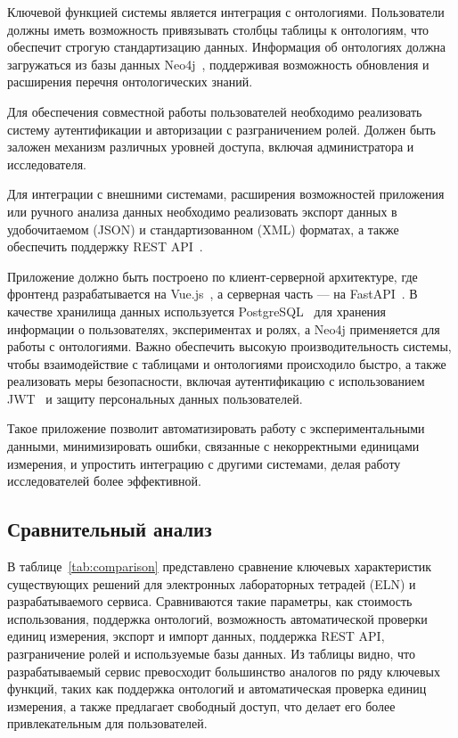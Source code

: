 Ключевой функцией системы является интеграция с онтологиями.
Пользователи должны иметь возможность привязывать столбцы таблицы к онтологиям, что обеспечит строгую стандартизацию данных.
Информация об онтологиях должна загружаться из базы данных Neo4j~\cite{DB:Neo4j}, поддерживая возможность обновления и расширения перечня онтологических знаний.

Для обеспечения совместной работы пользователей необходимо реализовать систему аутентификации и авторизации с разграничением ролей.
Должен быть заложен механизм различных уровней доступа, включая администратора и исследователя.

Для интеграции с внешними системами, расширения возможностей приложения или ручного анализа данных необходимо реализовать экспорт данных в удобочитаемом (JSON) и стандартизованном (XML) форматах, а также обеспечить поддержку REST API~\cite{arch:REST}.

Приложение должно быть построено по клиент-серверной архитектуре, где фронтенд разрабатывается на Vue.js~\cite{Framework:VueJS}, а серверная часть — на FastAPI~\cite{Framework:FastAPI}.
В качестве хранилища данных используется PostgreSQL~\cite{DB:PostgreSQL} для хранения информации о пользователях, экспериментах и ролях, а Neo4j применяется для работы с онтологиями.
Важно обеспечить высокую производительность системы, чтобы взаимодействие с таблицами и онтологиями происходило быстро, а также реализовать меры безопасности, включая аутентификацию с использованием JWT~\cite{Security:JWT} и защиту персональных данных пользователей.

Такое приложение позволит автоматизировать работу с экспериментальными данными, минимизировать ошибки, связанные с некорректными единицами измерения, и упростить интеграцию с другими системами, делая работу исследователей более эффективной.

\subsection{Сравнительный анализ}

В таблице~\ref{tab:comparison} представлено сравнение ключевых характеристик существующих решений для электронных лабораторных тетрадей (ELN) и разрабатываемого сервиса. Сравниваются такие параметры, как стоимость использования, поддержка онтологий, возможность автоматической проверки единиц измерения, экспорт и импорт данных, поддержка REST API, разграничение ролей и используемые базы данных. Из таблицы видно, что разрабатываемый сервис превосходит большинство аналогов по ряду ключевых функций, таких как поддержка онтологий и автоматическая проверка единиц измерения, а также предлагает свободный доступ, что делает его более привлекательным для пользователей.


